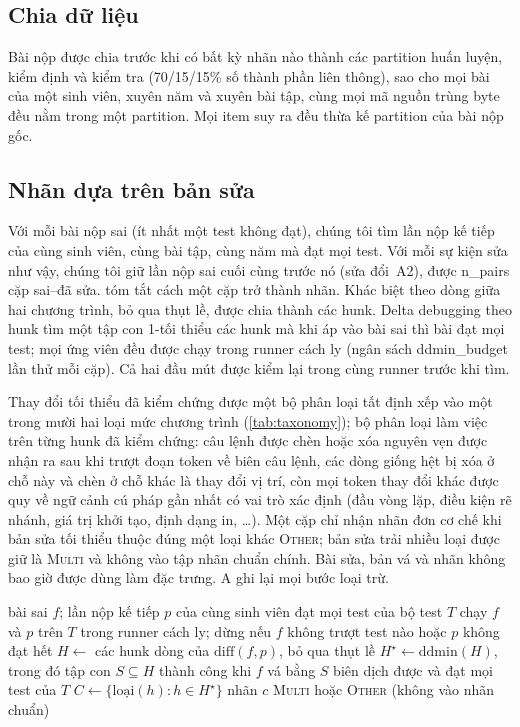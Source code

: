 \subsection{Chia dữ liệu}
Bài nộp được chia trước khi có bất kỳ nhãn nào thành các partition huấn luyện, kiểm định và kiểm tra (70/15/15\% số thành phần liên thông), sao cho mọi bài của một sinh viên, xuyên năm và xuyên bài tập, cùng mọi mã nguồn trùng byte đều nằm trong một partition. Mọi item suy ra đều thừa kế partition của bài nộp gốc.

\subsection{Nhãn dựa trên bản sửa}\label{sec:real}
Với mỗi bài nộp sai (ít nhất một test không đạt), chúng tôi tìm lần nộp kế tiếp của cùng sinh viên, cùng bài tập, cùng năm mà đạt mọi test. Với mỗi sự kiện sửa như vậy, chúng tôi giữ lần nộp sai cuối cùng trước nó (sửa đổi~A2), được {{n_pairs}} cặp sai--đã sửa.  tóm tắt cách một cặp trở thành nhãn. Khác biệt theo dòng giữa hai chương trình, bỏ qua thụt lề, được chia thành các hunk. Delta debugging theo hunk \citep{zeller2002ddmin} tìm một tập con 1-tối thiểu các hunk mà khi áp vào bài sai thì bài đạt mọi test; mọi ứng viên đều được chạy trong runner cách ly (ngân sách {{ddmin_budget}} lần thử mỗi cặp). Cả hai đầu mút được kiểm lại trong cùng runner trước khi tìm.

Thay đổi tối thiểu đã kiểm chứng được một bộ phân loại tất định xếp vào một trong mười hai loại mức chương trình (\cref{tab:taxonomy}); bộ phân loại làm việc trên từng hunk đã kiểm chứng: câu lệnh được chèn hoặc xóa nguyên vẹn được nhận ra sau khi trượt đoạn token về biên câu lệnh, các dòng giống hệt bị xóa ở chỗ này và chèn ở chỗ khác là thay đổi vị trí, còn mọi token thay đổi khác được quy về ngữ cảnh cú pháp gần nhất có vai trò xác định (đầu vòng lặp, điều kiện rẽ nhánh, giá trị khởi tạo, định dạng in, \dots). Một cặp chỉ nhận nhãn đơn cơ chế khi bản sửa tối thiểu thuộc đúng một loại khác \textsc{Other}; bản sửa trải nhiều loại được giữ là \textsc{Multi} và không vào tập nhãn chuẩn chính. Bài sửa, bản vá và nhãn không bao giờ được dùng làm đặc trưng. A ghi lại mọi bước loại trừ.

\begin{algorithm}[t]
\caption{Gán nhãn từ bản sửa cho một sự kiện sửa}\label{alg:label}
\begin{algorithmic}[1]
\Require bài sai $f$; lần nộp kế tiếp $p$ của cùng sinh viên đạt mọi test của bộ test $T$
\State chạy $f$ và $p$ trên $T$ trong runner cách ly; dừng nếu $f$ không trượt test nào hoặc $p$ không đạt hết 
\State $H \gets$ các hunk dòng của $\mathrm{diff}(f, p)$, bỏ qua thụt lề
\State $H^\star \gets \mathrm{ddmin}(H)$, trong đó tập con $S \subseteq H$ thành công khi $f$ vá bằng $S$ biên dịch được và đạt mọi test của $T$
\State $C \gets \{\text{loại}(h) : h \in H^\star\}$ 
  \State \Return nhãn $c$
\Else
  \State \Return \textsc{Multi} hoặc \textsc{Other} (không vào nhãn chuẩn)
\EndIf
\end{algorithmic}
\end{algorithm}

